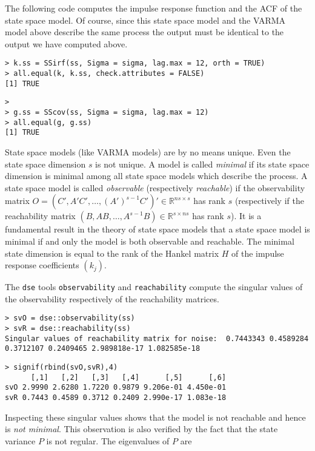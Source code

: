 \documentclass[]{article}
\begin{document}
The following code computes the impulse response function and the ACF of
the state space model. Of course, since this state space model and the
VARMA model above describe the same process the output must be identical
to the output we have computed above.

\begin{verbatim}
> k.ss = SSirf(ss, Sigma = sigma, lag.max = 12, orth = TRUE)
> all.equal(k, k.ss, check.attributes = FALSE)
[1] TRUE
\end{verbatim}

\begin{verbatim}
> 
> g.ss = SScov(ss, Sigma = sigma, lag.max = 12)
> all.equal(g, g.ss)
[1] TRUE
\end{verbatim}

State space models (like VARMA models) are by no means unique. Even the
state space dimension \(s\) is not unique. A model is called
\emph{minimal} if its state space dimension is minimal among all state
space models which describe the process. A state space model is called
\emph{observable} (respectively \emph{reachable}) if the observability
matrix \(O = (C',A'C',\ldots,(A')^{s-1}C')'\in \mathbb{R}^{ns\times s}\)
has rank \(s\) (respectively if the reachability matrix
\((B,AB,\ldots,A^{s-1}B)\in\mathbb{R}^{s\times ns}\) has rank \(s\)). It
is a fundamental result in the theory of state space models that a state
space model is minimal if and only the model is both observable and
reachable. The minimal state dimension is equal to the rank of the
Hankel matrix \(H\) of the impulse response coefficients \((k_j)\).

The \texttt{dse} tools \texttt{observability} and \texttt{reachability}
compute the singular values of the observability respectively of the
reachability matrices.

\begin{verbatim}
> svO = dse::observability(ss)
> svR = dse::reachability(ss)
Singular values of reachability matrix for noise:  0.7443343 0.4589284 0.3712107 0.2409465 2.989818e-17 1.082585e-18 
\end{verbatim}

\begin{verbatim}
> signif(rbind(svO,svR),4)
      [,1]   [,2]   [,3]   [,4]      [,5]      [,6]
svO 2.9990 2.6280 1.7220 0.9879 9.206e-01 4.450e-01
svR 0.7443 0.4589 0.3712 0.2409 2.990e-17 1.083e-18
\end{verbatim}

Inspecting these singular values shows that the model is not reachable
and hence is \emph{not minimal}. This observation is also verified by
the fact that the state variance \(P\) is not regular. The eigenvalues
of \(P\) are
\end{document}
